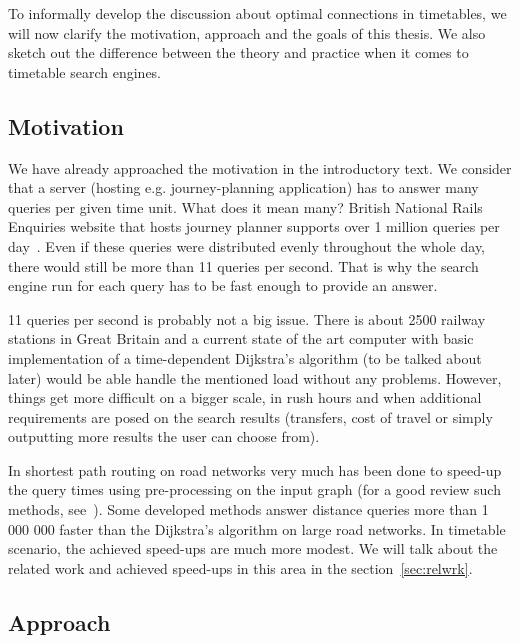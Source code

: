 \noindent To informally develop the discussion about optimal connections in timetables, we will now clarify the motivation, approach and the goals of this thesis. We also sketch out the difference between the theory and practice when it comes to timetable search engines.

\subsection{Motivation}

	\noindent We have already approached the motivation in the introductory text. We consider that a server (hosting e.g. journey-planning application) has to answer many queries per given time unit. What does it mean many? British National Rails Enquiries website that hosts journey planner supports over 1 million queries per day~\cite{queriesnr}. Even if these queries were distributed evenly throughout the whole day, there would still be more than 11 queries per second. That is why the search engine run for each query has to be fast enough to provide an answer.
	
	11 queries per second is probably not a big issue. There is about 2500 railway stations in Great Britain and a current state of the art computer with basic implementation of a time-dependent Dijkstra's algorithm (to be talked about later) would be able handle the mentioned load without any problems. However, things get more difficult on a bigger scale, in rush hours and when additional requirements are posed on the search results (transfers, cost of travel or simply outputting more results the user can choose from).
	
	In shortest path routing on road networks very much has been done to speed-up the query times using pre-processing on the input graph (for a good review such methods, see~\cite{engineeringroute09}). Some developed methods answer distance queries more than 1 000 000 faster than the Dijkstra's algorithm on large road networks. In timetable scenario, the achieved speed-ups are much more modest. We will talk about the related work and achieved speed-ups in this area in the section~\ref{sec:relwrk}.
		
\subsection{Approach}

